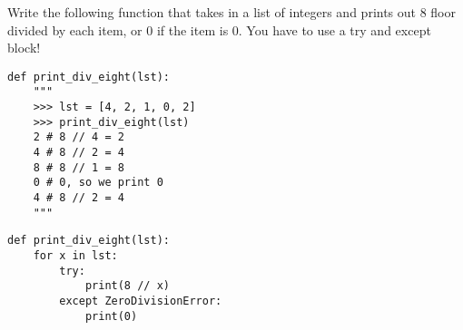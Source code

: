 \begin{blocksection}
\question Write the following function that takes in a list of integers and prints out 8 floor divided by each item, or 0 if the item is 0. You have to use a try and except block!

\begin{lstlisting}
def print_div_eight(lst):
    """
    >>> lst = [4, 2, 1, 0, 2]
    >>> print_div_eight(lst)
    2 # 8 // 4 = 2
    4 # 8 // 2 = 4
    8 # 8 // 1 = 8
    0 # 0, so we print 0
    4 # 8 // 2 = 4
    """
\end{lstlisting}
\begin{solution}[1in]
\begin{lstlisting}
def print_div_eight(lst):
    for x in lst:
    	try:
    	    print(8 // x)
    	except ZeroDivisionError:
    	    print(0)
\end{lstlisting}
\end{solution}
\end{blocksection}